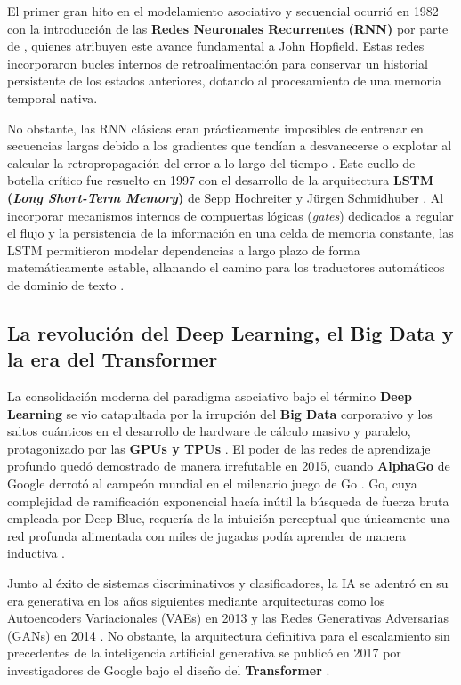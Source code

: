 \documentclass[12pt, a4paper]{article}
\begin{document}
El primer gran hito en el modelamiento asociativo y secuencial ocurrió en 1982 con la introducción de las \textbf{Redes Neuronales Recurrentes (RNN)} por parte de \textcite{zhang2023turing}, quienes atribuyen este avance fundamental a John Hopfield. Estas redes incorporaron bucles internos de retroalimentación para conservar un historial persistente de los estados anteriores, dotando al procesamiento de una memoria temporal nativa.

No obstante, las RNN clásicas eran prácticamente imposibles de entrenar en secuencias largas debido a los gradientes que tendían a desvanecerse o explotar al calcular la retropropagación del error a lo largo del tiempo \parencite{zhang2023turing}. Este cuello de botella crítico fue resuelto en 1997 con el desarrollo de la arquitectura \textbf{LSTM (\textit{Long Short-Term Memory})} de Sepp Hochreiter y Jürgen Schmidhuber \parencite{zhang2023turing}. Al incorporar mecanismos internos de compuertas lógicas (\textit{gates}) dedicados a regular el flujo y la persistencia de la información en una celda de memoria constante, las LSTM permitieron modelar dependencias a largo plazo de forma matemáticamente estable, allanando el camino para los traductores automáticos de dominio de texto \parencite{zhang2023turing}.

\subsection{La revolución del Deep Learning, el Big Data y la era del Transformer}

La consolidación moderna del paradigma asociativo bajo el término \textbf{Deep Learning} se vio catapultada por la irrupción del \textbf{Big Data} corporativo y los saltos cuánticos en el desarrollo de hardware de cálculo masivo y paralelo, protagonizado por las \textbf{GPUs y TPUs} \parencite{haenlein2019brief, zhang2023turing}. El poder de las redes de aprendizaje profundo quedó demostrado de manera irrefutable en 2015, cuando \textbf{AlphaGo} de Google derrotó al campeón mundial en el milenario juego de Go \parencite{haenlein2019brief}. Go, cuya complejidad de ramificación exponencial hacía inútil la búsqueda de fuerza bruta empleada por Deep Blue, requería de la intuición perceptual que únicamente una red profunda alimentada con miles de jugadas podía aprender de manera inductiva \parencite{haenlein2019brief}. 

Junto al éxito de sistemas discriminativos y clasificadores, la IA se adentró en su era generativa en los años siguientes mediante arquitecturas como los Autoencoders Variacionales (VAEs) en 2013 y las Redes Generativas Adversarias (GANs) en 2014 \parencite{zhang2023turing}. No obstante, la arquitectura definitiva para el escalamiento sin precedentes de la inteligencia artificial generativa se publicó en 2017 por investigadores de Google bajo el diseño del \textbf{Transformer} \parencite{zhang2023turing}. 
\end{document}
